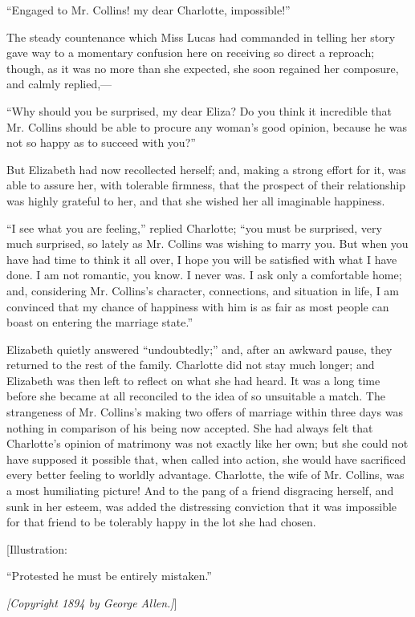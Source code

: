 \documentclass[12pt]{book}
\begin{document}
``Engaged to Mr. Collins! my dear Charlotte, impossible!''

The steady countenance which Miss Lucas had commanded in telling her story gave way to a momentary confusion here on receiving so direct a reproach; though, as it was no more than she expected, she soon regained her composure, and calmly replied,---

``Why should you be surprised, my dear Eliza? Do you think it incredible that Mr. Collins should be able to procure any woman's good opinion, because he was not so happy as to succeed with you?''

But Elizabeth had now recollected herself; and, making a strong effort for it, was able to assure her, with tolerable firmness, that the prospect of their relationship was highly grateful to her, and that she wished her all imaginable happiness.

``I see what you are feeling,'' replied Charlotte; ``you must be surprised, very much surprised, so lately as Mr. Collins was wishing to marry you. But when you have had time to think it all over, I hope you will be satisfied with what I have done. I am not romantic, you know. I never was. I ask only a comfortable home; and, considering Mr. Collins's character, connections, and situation in life, I am convinced that my chance of happiness with him is as fair as most people can boast on entering the marriage state.''

Elizabeth quietly answered ``undoubtedly;'' and, after an awkward pause, they returned to the rest of the family. Charlotte did not stay much longer; and Elizabeth was then left to reflect on what she had heard. It was a long time before she became at all reconciled to the idea of so unsuitable a match. The strangeness of Mr. Collins's making two offers of marriage within three days was nothing in comparison of his being now accepted. She had always felt that Charlotte's opinion of matrimony was not exactly like her own; but she could not have supposed it possible that, when called into action, she would have sacrificed every better feeling to worldly advantage. Charlotte, the wife of Mr. Collins, was a most humiliating picture! And to the pang of a friend disgracing herself, and sunk in her esteem, was added the distressing conviction that it was impossible for that friend to be tolerably happy in the lot she had chosen.

[Illustration:

``Protested he must be entirely mistaken.''

\emph{[\textit{Copyright 1894 by George Allen.}]}]
\end{document}
